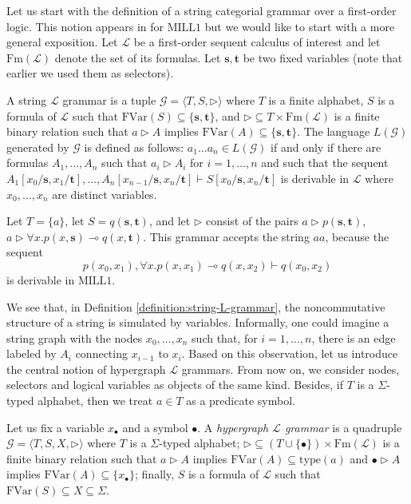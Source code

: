\documentclass[a4paper,UKenglish,cleveref, autoref, thm-restate,pdfa]{lipics-v2021}
\newcommand{\Gram}{\mathcal{G}}
\newcommand{\type}{\mathrm{type}}
\newcommand{\lt}{\mathbf{s}}
\newcommand{\rt}{\mathbf{t}}
\newcommand{\FVar}{\mathrm{FVar}}
\newcommand{\Fm}{\mathrm{Fm}}
\newcommand{\limpl}{\multimap}
\newcommand{\Logic}{\mathcal{L}}
\newcommand{\MILLFO}{\mathrm{MILL}1}
\begin{document}
Let us start with the definition of a string categorial grammar over a first-order logic. This notion appears in \cite{Moot14,Slavnov23} for $\MILLFO$ but we would like to start with a more general exposition. Let $\Logic$ be a first-order sequent calculus of interest and let $\Fm(\Logic)$ denote the set of its formulas. Let $\lt,\rt$ be two fixed variables (note that earlier we used them as selectors).

\begin{definition}\label{definition:string-L-grammar}
	A string $\Logic$ grammar is a tuple $\Gram = \langle T, S, \triangleright \rangle$ where $T$ is a finite alphabet, $S$ is a formula of $\Logic$ such that $\FVar(S) \subseteq \{\lt,\rt\}$, and $\triangleright \subseteq T \times \Fm(\Logic)$ is a finite binary relation such that $a \triangleright A$ implies $\FVar(A) \subseteq \{\lt,\rt\}$.
	The language $L(\Gram)$ generated by $\Gram$ is defined as follows: $a_1\ldots a_n \in L(\Gram)$ if and only if there are formulas $A_1,\ldots,A_n$ such that $a_i \triangleright A_i$ for $i=1,\ldots,n$ and such that the sequent $A_1[x_0/\lt,x_1/\rt], \ldots, A_n[x_{n-1}/\lt,x_n/\rt] \vdash S[x_0/\lt,x_n/\rt]$ is derivable in $\Logic$ where $x_0,\ldots,x_n$ are distinct variables.
\end{definition}

\begin{example}\label{example:string-L-grammar}
	Let $T=\{a\}$, let $S = q(\lt,\rt)$, and let $\triangleright$ consist of the pairs $a \triangleright p(\lt,\rt)$, $a \triangleright \forall x. p(x,\lt) \limpl q(x,\rt)$. This grammar accepts the string $aa$, because the sequent $$p(x_0,x_1),\forall x. p(x,x_1) \limpl q(x,x_2) \vdash q(x_0,x_2)$$ is derivable in $\MILLFO$.
\end{example}

We see that, in Definition \ref{definition:string-L-grammar}, the noncommutative structure of a string is simulated by variables. Informally, one could imagine a string graph with the nodes $x_0,\ldots,x_n$ such that, for $i=1,\ldots,n$, there is an edge labeled by $A_i$ connecting $x_{i-1}$ to $x_i$. Based on this observation, let us introduce the central notion of hypergraph $\Logic$ grammars. From now on, we consider nodes, selectors and logical variables as objects of the same kind. Besides, if $T$ is a $\Sigma$-typed alphabet, then we treat $a \in T$ as a predicate symbol. 

\begin{definition}\label{definition:hypergraph-L-grammar}
	Let us fix a variable $x_\bullet$ and a symbol $\bullet$. A \emph{hypergraph $\Logic$ grammar} is a quadruple $\Gram = \langle T, S, X, \triangleright \rangle$ where $T$ is a $\Sigma$-typed alphabet; $\triangleright \subseteq (T \cup \{\bullet\}) \times \Fm({\Logic})$ is a finite binary relation such that $a \triangleright A$ implies $\FVar(A) \subseteq \type(a)$ and $\bullet \triangleright A$ implies $\FVar(A) \subseteq \{x_\bullet\}$; finally, $S$ is a formula of $\Logic$ such that $\FVar(S) \subseteq X \subseteq \Sigma$.
\end{definition}
\end{document}
